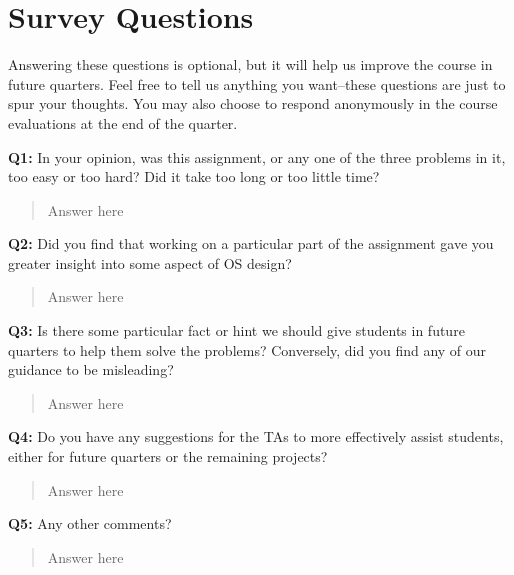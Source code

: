 \documentclass[a4paper,11pt]{paper}
\begin{document}
\section{Survey Questions}

Answering these questions is optional, but it will help us improve the course in future quarters.  Feel free to tell us anything you want--these questions are just to spur your thoughts.  You may also choose to respond anonymously in the course evaluations at the end of the quarter.

\textbf{Q1:} In your opinion, was this assignment, or any one of the three problems in it, too easy or too hard?  Did it take too long or too little time?
\begin{quote}
  Answer here
\end{quote}

\textbf{Q2:} Did you find that working on a particular part of the assignment gave you greater insight into some aspect of OS design?
\begin{quote}
  Answer here
\end{quote}

\textbf{Q3:} Is there some particular fact or hint we should give students in future quarters to help them solve the problems?  Conversely, did you find any of our guidance to be misleading?
\begin{quote}
  Answer here
\end{quote}

\textbf{Q4:} Do you have any suggestions for the TAs to more effectively assist students, either for future quarters or the remaining projects?
\begin{quote}
  Answer here
\end{quote}

\textbf{Q5:} Any other comments?
\begin{quote}
  Answer here
\end{quote}
\end{document}
